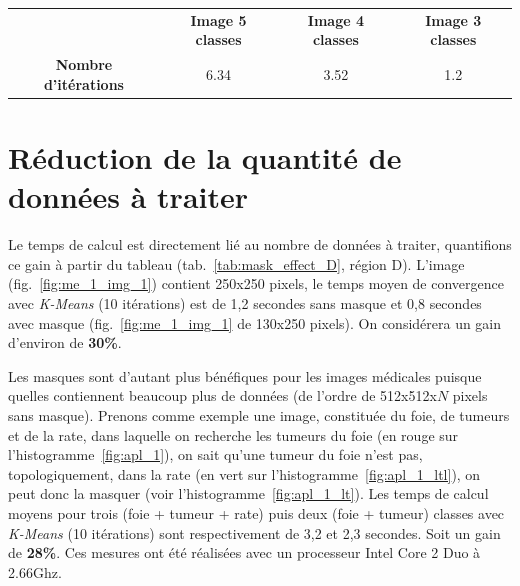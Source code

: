 \begin{center}
		\begin{tabular}{c|c|c|c|}

		\cline{2-4}
					& \textbf{Image 5 classes}		& \textbf{Image 4 classes} 	& \textbf{Image 3 classes} 	\\
		\cline{1-4}
	 	\multicolumn{1}{|c|}{\textbf{Nombre d'itérations}} & 6.34	 		& 3.52			& 1.2			\\
	 	 \cline{1-4}
	\end{tabular}
	\label{tab:convergence_time}
\end{center}





		\section{Réduction de la quantité de données à traiter}
		Le temps de calcul est directement lié au nombre de données à traiter, quantifions ce gain à partir du tableau (tab.~\ref{tab:mask_effect_D}, région D). L'image (fig.~\ref{fig:me_1_img_1}) contient 250x250 pixels, le temps moyen de convergence avec \emph{K-Means} (10 itérations) est de 1,2 secondes sans masque et 0,8 secondes avec masque (fig.~\ref{fig:me_1_img_1} de 130x250 pixels). On considérera un gain d'environ de \textbf{30\%}.
		
		Les masques sont d'autant plus bénéfiques pour les images médicales puisque quelles contiennent beaucoup plus de données (de l'ordre de 512x512x$N$ pixels sans masque). Prenons comme exemple une image, constituée du foie, de tumeurs et de la rate, dans laquelle on recherche les tumeurs du foie (en rouge sur l'histogramme~\ref{fig:apl_1}), on sait qu'une tumeur du foie n'est pas, topologiquement, dans la rate (en vert sur l'histogramme~\ref{fig:apl_1_ltl}), on peut donc la masquer (voir l'histogramme~\ref{fig:apl_1_lt}). Les temps de calcul moyens pour trois (foie + tumeur + rate) puis deux (foie + tumeur) classes avec \emph{K-Means} (10 itérations) sont respectivement de 3,2 et 2,3 secondes. Soit un gain de \textbf{28\%}. Ces mesures ont été réalisées avec un processeur Intel Core 2 Duo à 2.66Ghz.



